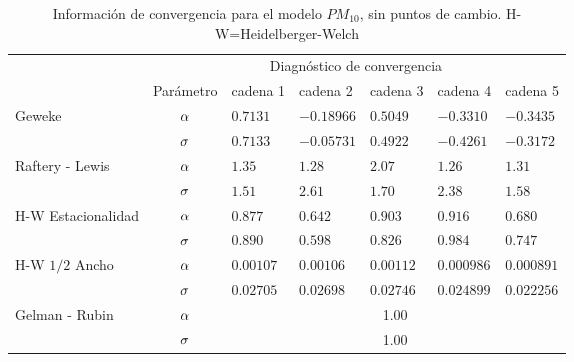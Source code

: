 \begin{table}[!h]
\centering
\begin{tabular}{|l|c|l|l|l|l|l|}
\hline
& \multicolumn{6}{|c|}{Diagnóstico de convergencia} \\
\cline{2-7}
& Parámetro & cadena 1  & cadena 2  & cadena 3 & cadena 4 & cadena 5	 \\
\hline \hline
\multirow{2}{2.5cm}{Geweke} & $\alpha$ & $0.7131$ & $-0.18966$ & $0.5049$ & $-0.3310$  & $-0.3435$\\ \cline{2-7}
& $\sigma$& $0.7133$ & $-0.05731$ & $0.4922$ & $-0.4261$ & $-0.3172$\\
  \cline{1-7}
\multirow{2}{2.5cm}{Raftery - Lewis} & $\alpha$ & $1.35$& $ 1.28$ & $2.07$ & $1.26 $ & $  1.31 $\\ \cline{2-7}
& $\sigma$ & \multicolumn{1}{l|}{$1.51$} & $2.61$ & $1.70$ & $2.38 $ & $1.58$ \\ \cline{1-7}
\multirow{2}{2.5cm}{H-W Estacionalidad} & $\alpha$ & $0.877$ & $0.642$ & $0.903$ & $0.916$ & $0.680$ \\ \cline{2-7}
&$\sigma$ & \multicolumn{1}{l|}{$0.890$} & $0.598$ &  $ 0.826$ & $0.984$ & $0.747 $ \\ \cline{1-7}
\multirow{2}{2.5cm}{H-W $1/2$ Ancho} & $\alpha$ & $0.00107$ & $ 0.00106$ & $ 0.00112$ & $0.000986 $  & $ 0.000891  $  \\ \cline{2-7}
&$\sigma$ & \multicolumn{1}{l|}{$0.02705  $} & $0.02698$ & $0.02746  $ & $0.024899$ & $0.022256$ \\ \cline{1-7}

\multirow{2}{2.5cm}{Gelman - Rubin} & $\alpha$ & \multicolumn{5}{|c|}{1.00}\\ \cline{2-7}
&$\sigma$ &  \multicolumn{5}{|c|}{1.00} \\ \cline{1-7}



\end{tabular}
\caption{Información de convergencia para el modelo $PM_{10}$, sin puntos de cambio. H-W=Heidelberger-Welch}

\label{converpm10spc}
\end{table}






